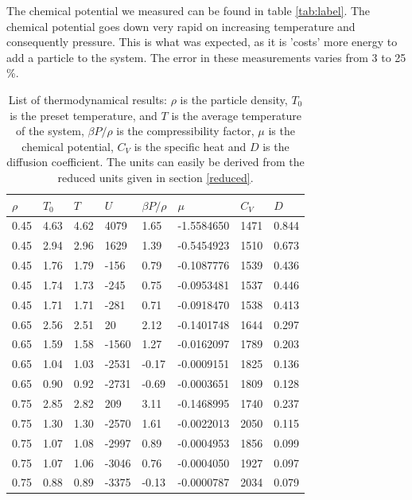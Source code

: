 \documentclass{article}
\begin{document}
The chemical potential we measured can be found in table \ref{tab:label}. The chemical potential goes down very rapid on increasing temperature and consequently pressure. This is what was expected, as it is 'costs' more energy to add a particle to the system. The error in these measurements varies from 3 to 25 \%. \\

\begin{table}[!htb]
\centering
\label{tab:tabel}
\caption{List of thermodynamical results: $\rho$ is the particle density, $T_0$ is the preset temperature, and $T$ is the average temperature of the system, $\beta P/ \rho$ is the compressibility factor, $\mu$ is the chemical potential, $C_V$ is the specific heat and $D$ is the diffusion coefficient. The units can easily be derived from the reduced units given in section \ref{reduced}.}
\begin{tabular}{|l|l|l|l|l|l|l|l|}
\hline
$\rho$ & $T_{0}$ & $T$ & $U$ & $\beta P/ \rho$ & $\mu$ & $C_V$ & $D$\\ \hline
0.45 & 4.63 & 4.62 & 4079 & 1.65 & -1.5584650 & 1471 & 0.844\\ \hline
0.45 & 2.94 & 2.96 & 1629 & 1.39 & -0.5454923 & 1510 & 0.673\\ \hline
0.45 & 1.76 & 1.79 & -156 & 0.79 & -0.1087776 & 1539 & 0.436\\ \hline
0.45 & 1.74 & 1.73 & -245 & 0.75 & -0.0953481 & 1537 & 0.446\\ \hline
0.45 & 1.71 & 1.71 & -281 & 0.71 & -0.0918470 & 1538 & 0.413\\ \hline
0.65 & 2.56 & 2.51 & 20 & 2.12 & -0.1401748 & 1644 & 0.297\\ \hline
0.65 & 1.59 & 1.58 & -1560 & 1.27 & -0.0162097 & 1789 & 0.203\\ \hline
0.65 & 1.04 & 1.03 & -2531 & -0.17 & -0.0009151 & 1825 & 0.136\\ \hline
0.65 & 0.90 & 0.92 & -2731 & -0.69 & -0.0003651 & 1809 & 0.128\\ \hline
0.75 & 2.85 & 2.82 & 209 & 3.11 & -0.1468995 & 1740 & 0.237\\ \hline
0.75 & 1.30 & 1.30 & -2570 & 1.61 & -0.0022013 & 2050 & 0.115\\ \hline
0.75 & 1.07 & 1.08 & -2997 & 0.89 & -0.0004953 & 1856 & 0.099\\ \hline
0.75 & 1.07 & 1.06 & -3046 & 0.76 & -0.0004050 & 1927 & 0.097\\ \hline
0.75 & 0.88 & 0.89 & -3375 & -0.13 & -0.0000787 & 2034 & 0.079\\ \hline

\end{tabular}
\end{table}
\end{document}
